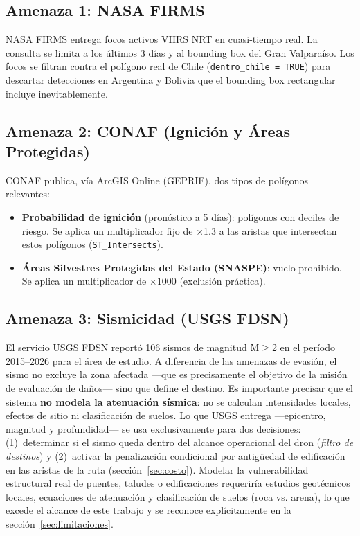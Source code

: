 \documentclass[conference]{IEEEtran}
\begin{document}
\subsection{Amenaza 1: NASA FIRMS}

NASA FIRMS entrega focos activos VIIRS NRT en cuasi-tiempo real. La consulta se limita a los últimos 3 días y al bounding box del Gran Valparaíso. Los focos se filtran contra el polígono real de Chile (\texttt{dentro\_chile = TRUE}) para descartar detecciones en Argentina y Bolivia que el bounding box rectangular incluye inevitablemente.

\subsection{Amenaza 2: CONAF (Ignición y Áreas Protegidas)}

CONAF publica, vía ArcGIS Online (GEPRIF), dos tipos de polígonos relevantes:

\begin{itemize}[itemsep=2pt]
\item \textbf{Probabilidad de ignición} (pronóstico a 5 días): polígonos con deciles de riesgo. Se aplica un multiplicador fijo de $\times$1.3 a las aristas que intersectan estos polígonos (\texttt{ST\_Intersects}).
\item \textbf{Áreas Silvestres Protegidas del Estado (SNASPE)}: vuelo prohibido. Se aplica un multiplicador de $\times$1000 (exclusión práctica).
\end{itemize}

\subsection{Amenaza 3: Sismicidad (USGS FDSN)}

El servicio USGS FDSN reportó 106 sismos de magnitud M$\geq$2 en el período 2015--2026 para el área de estudio. A diferencia de las amenazas de evasión, el sismo no excluye la zona afectada ---que es precisamente el objetivo de la misión de evaluación de daños--- sino que define el destino. Es importante precisar que el sistema \textbf{no modela la atenuación sísmica}: no se calculan intensidades locales, efectos de sitio ni clasificación de suelos. Lo que USGS entrega ---epicentro, magnitud y profundidad--- se usa exclusivamente para dos decisiones: (1)~determinar si el sismo queda dentro del alcance operacional del dron (\textit{filtro de destinos}) y (2)~activar la penalización condicional por antigüedad de edificación en las aristas de la ruta (sección~\ref{sec:costo}). Modelar la vulnerabilidad estructural real de puentes, taludes o edificaciones requeriría estudios geotécnicos locales, ecuaciones de atenuación y clasificación de suelos (roca vs. arena), lo que excede el alcance de este trabajo y se reconoce explícitamente en la sección~\ref{sec:limitaciones}.
\end{document}
